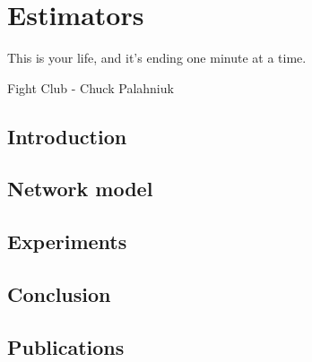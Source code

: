 \chapter{Estimators} %
\label{cha:estimators}

\epigraph{This is your life, and it's ending one minute at a time.}{Fight Club - Chuck Palahniuk}

\minitoc

\section{Introduction} %
\label{sec:estimators_introduction}

\lipsum


\section{Network model} %
\label{sec:estimators_network_model}

\lipsum


\section{Experiments} %
\label{sec:estimators_experiments}

\lipsum


\section{Conclusion} %
\label{sec:estimators_conclusion}

\lipsum


\section{Publications} %
\label{sec:estimators_publications}


